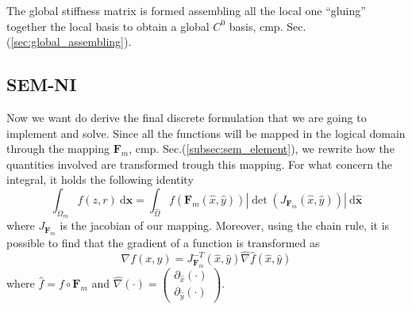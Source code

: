 The global stiffness matrix is formed assembling all the local one \textquotedblleft{gluing\textquotedblright} together the local basis to obtain a global $C^0$ basis, cmp. Sec.(\ref{sec:global_assembling}).

\subsection{SEM-NI}
Now we want do derive the final discrete formulation that we are going to implement and solve. Since all the functions will be mapped in the logical domain through the mapping $\mathbf{F}_m$, cmp. Sec.(\ref{subsec:sem_element}), we rewrite how the quantities involved are transformed trough this mapping. For what concern the integral, it holds the following identity
\begin{equation}\label{eq:integral_transf}
  \int_{\Omega_m} f(z,r)\:\mathrm{d}\mathbf{x} =\int_{\hat{\Omega}}f(\mathbf{F}_m(\hat{x},\hat{y}))|\det(J_{\mathbf{F}_m}(\hat{x},\hat{y}))|\:\mathrm{d}\hat{\mathbf{x}}
\end{equation}
where $J_{\mathbf{F}_m}$ is the jacobian of our mapping. Moreover, using the chain rule, it is possible to find that the gradient of a function is transformed as
\begin{equation}\label{eq:grad_transf}
  \nabla f(x,y)=J_{\mathbf{F}_m}^{-T}(\hat{x},\hat{y})\hat{\nabla}\hat{f}(\hat{x},\hat{y})
\end{equation}
where $\hat{f}=f\circ\mathbf{F}_m$ and $\hat{\nabla}(\cdot)=\left(\begin{array}{c}\partial_{\hat{x}}(\cdot)\\\partial_{\hat{y}}(\cdot)\end{array}\right)$.
\medskip

